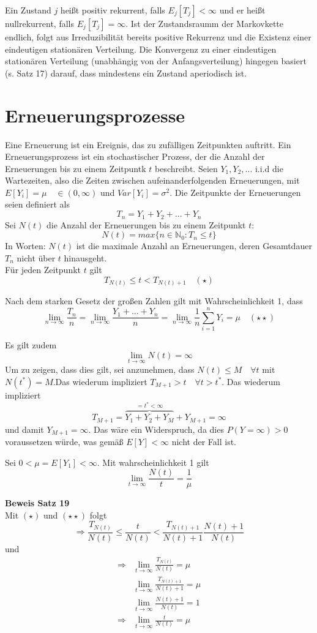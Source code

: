 \documentclass[a4paper,12pt]{article}
\begin{document}
Ein Zustand $j$ heißt positiv rekurrent, falls $E_j[T_j] < \infty$ und er heißt nullrekurrent, falls
$E_j[T_j] = \infty$. Ist der Zustandsraumm der Markovkette endlich, folgt aus
Irreduzibilität bereits positive Rekurrenz und die Existenz einer eindeutigen stationären Verteilung.
Die Konvergenz zu einer eindeutigen stationären Verteilung (unabhängig von der Anfangsverteilung) hingegen basiert (s. Satz 17) darauf,
dass mindestens ein Zustand aperiodisch ist.


\section{Erneuerungsprozesse}
Eine Erneuerung ist ein Ereignis, das zu zufälligen Zeitpunkten auftritt.
Ein Erneuerungsprozess ist ein stochastischer Prozess, der die Anzahl der Erneuerungen bis
zu einem Zeitpuntk $t$ beschreibt. Seien $Y_1, Y_2, ...$ i.i.d die Wartezeiten, also die
Zeiten zwischen aufeinanderfolgenden Erneuerungen, mit $E[Y_i] = \mu \quad \in (0,\infty)$ und
$Var[Y_i] = \sigma^2$. Die Zeitpunkte der Erneuerungen seien definiert als
$$
	T_n = Y_1 + Y_2 + ... + Y_n
$$
Sei $N(t)$ die Anzahl der Erneuerungen bis zu einem Zeitpunkt $t$:
$$
	N(t) = max\{n \in \mathbb{N}_0: T_n \leq t\}
$$
In Worten: $N(t)$ ist die maximale Anzahl an Erneuerungen, deren Gesamtdauer
$T_n$ nicht über $t$ hinausgeht. \\
Für jeden Zeitpunkt $t$ gilt
$$
	T_{N(t)} \leq t < T_{N(t)+1} \quad (\star)
$$

Nach dem starken Gesetz der großen Zahlen gilt mit Wahrscheinlichkeit 1, dass
$$
	\lim_{n \to \infty}\frac{T_n}{n} =
	\lim_{n \to \infty}\frac{Y_1 + ... + Y_n}{n} =
	\lim_{n  \to \infty} \frac{1}{n}\sum_{i=1}^{n}Y_i =
	\mu \quad (\star \star)
$$

Es gilt zudem
$$
	\lim_{t \to \infty} N(t) = \infty
$$
Um zu zeigen, dass dies gilt, sei anzunehmen, dass
$N(t) \leq M \quad \forall t$ mit $N(t^*) = M$.Das wiederum impliziert
$T_{M+1}>t \quad \forall t > t^*$. Das wiederum impliziert
$$
	T_{M+1} = \overbrace{Y_1 + Y_2 + Y_M}^{= t^* < \infty} + Y_{M+1} = \infty
$$
und damit $Y_{M+1} = \infty$. Das wäre ein Widerspruch, da dies
$P(Y = \infty) > 0$ voraussetzen würde, was gemäß $E[Y]< \infty$ nicht
der Fall ist.

\begin{tcolorbox}[breakable, colframe=green, colback=white, title=Satz 19]
	Sei $0 < \mu = E[Y_1] < \infty$. Mit wahrscheinlichkeit 1 gilt
	$$
		\lim_{t \to \infty}\frac{N(t)}{t} = \frac{1}{\mu}
	$$
\end{tcolorbox}
\textbf{Beweis Satz 19}\\
Mit $(\star)$ und $(\star \star)$ folgt
$$
	\Rightarrow \frac{T_{N(t)}}{N(t)} \leq \frac{t}{N(t)} <
	\frac{T_{N(t)+1}}{N(t)+1} \frac{N(t)+1}{N(t)}
$$
und
\begin{align*}
	\Rightarrow & \lim_{t \to \infty} \frac{T_{N(t)}}{N(t)} = \mu     \\
	            & \lim_{t \to \infty} \frac{T_{N(t)+1}}{N(t)+1} = \mu \\
	            & \lim_{t \to \infty} \frac{N(t)+1}{N(t)} = 1         \\
	\Rightarrow & \lim_{t \to \infty} \frac{t}{N(t)} = \mu
\end{align*}
\end{document}
